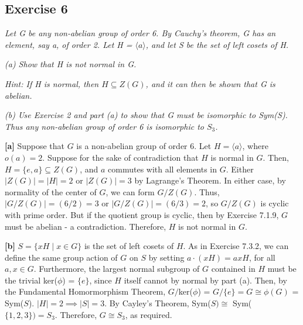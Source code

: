\subsection*{Exercise 6}
\textit{Let G be any non-abelian group of order 6. By Cauchy's theorem, G has an element, say a, of order 2. Let H = $\langle a \rangle$, and let S be the set of left cosets of H.}

\textit{(a) Show that H is not normal in G.}

\textit{Hint: If H is normal, then $H \subseteq Z(G)$, and it can then be shown that G is abelian.}

\textit{(b) Use Exercise 2 and part (a) to show that G must be isomorphic to Sym(S). Thus any non-abelian group of order 6 is isomorphic to $S_3$.}

\vspace{5 mm}
\textbf{[a]} Suppose that $G$ is a non-abelian group of order 6. Let $H = \langle a \rangle$, where $o(a) = 2$. Suppose for the sake of contradiction that $H$ is normal in $G$. Then, $H = \{e,a\} \subseteq Z(G)$, and $a$ commutes with all elements in $G$. Either $|Z(G)| = |H| = 2$ or $|Z(G)| = 3$ by Lagrange's Theorem. In either case, by normality of the center of $G$, we can form $G/Z(G)$. Thus, $|G/Z(G)| = (6/2) = 3$ or $|G/Z(G)| = (6/3) = 2$, so $G/Z(G)$ is cyclic with prime order. But if the quotient group is cyclic, then by Exercise 7.1.9, $G$ must be abelian - a contradiction. Therefore, $H$ is not normal in $G$.

\vspace{5 mm}
\textbf{[b]} $S = \{xH \mid x \in G\}$ is the set of left cosets of $H$. As in Exercise 7.3.2, we can define the same group action of $G$ on $S$ by setting $a \cdot (xH) = axH$, for all $a,x \in G$. Furthermore, the largest normal subgroup of $G$ contained in $H$ must be the trivial ker($\phi$) = $\{e\}$, since $H$ itself cannot by normal by part (a). Then, by the Fundamental Homormorphism Theorem, $G/$ker($\phi$) = $G/\{e\} = G \cong \phi(G)$ = Sym($S$). $|H| = 2 \implies |S| = 3$. By Cayley's Theorem, Sym($S) \cong$ Sym($\{1,2,3\}) = S_3$. Therefore, $G \cong S_3$, as required.